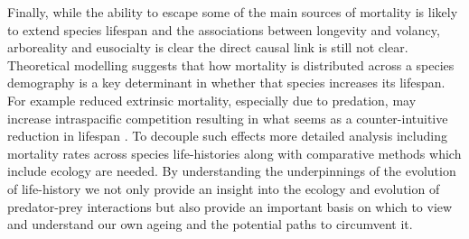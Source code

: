 Finally, while the ability to escape some of the main sources of mortality is likely to extend species lifespan and the associations between longevity and volancy, arboreality and eusocialty is clear the direct causal link is still not clear. Theoretical modelling suggests that how mortality is distributed across a species demography is a key determinant in whether that species increases its lifespan. For example reduced extrinsic mortality, especially due to predation, may increase intraspacific competition resulting in what seems as a counter-intuitive reduction in lifespan \citep{moorad2010evolution}. To decouple such effects more detailed analysis including mortality rates across species life-histories along with comparative methods which include ecology are needed. By understanding the underpinnings of the evolution of life-history we not only provide an insight into the ecology and evolution of predator-prey interactions but also provide an important basis on which to view and understand our own ageing and the potential paths to circumvent it.







